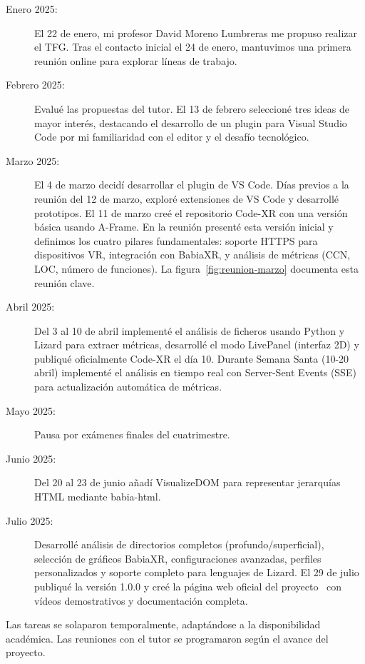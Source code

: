 \documentclass[a4paper, 12pt]{book}
\begin{document}
\begin{description}
    \item[Enero 2025:] El 22 de enero, mi profesor David Moreno Lumbreras me propuso realizar el TFG. Tras el contacto inicial el 24 de enero, mantuvimos una primera reunión online para explorar líneas de trabajo.

    \item[Febrero 2025:] Evalué las propuestas del tutor. El 13 de febrero seleccioné tres ideas de mayor interés, destacando el desarrollo de un plugin para Visual Studio Code por mi familiaridad con el editor y el desafío tecnológico.

    \item[Marzo 2025:] El 4 de marzo decidí desarrollar el plugin de VS Code. Días previos a la reunión del 12 de marzo, exploré extensiones de VS Code y desarrollé prototipos. El 11 de marzo creé el repositorio Code-XR con una versión básica usando A-Frame. En la reunión presenté esta versión inicial y definimos los cuatro pilares fundamentales: soporte HTTPS para dispositivos VR, integración con BabiaXR, y análisis de métricas (CCN, LOC, número de funciones). La figura~\ref{fig:reunion-marzo} documenta esta reunión clave.

    \item[Abril 2025:] Del 3 al 10 de abril implementé el análisis de ficheros usando Python y Lizard para extraer métricas, desarrollé el modo LivePanel (interfaz 2D) y publiqué oficialmente Code-XR el día 10. Durante Semana Santa (10-20 abril) implementé el análisis en tiempo real con Server-Sent Events (SSE) para actualización automática de métricas.

    \item[Mayo 2025:] Pausa por exámenes finales del cuatrimestre.

    \item[Junio 2025:] Del 20 al 23 de junio añadí VisualizeDOM para representar jerarquías HTML mediante babia-html.

    \item[Julio 2025:] Desarrollé análisis de directorios completos (profundo/superficial), selección de gráficos BabiaXR, configuraciones avanzadas, perfiles personalizados y soporte completo para lenguajes de Lizard. El 29 de julio publiqué la versión 1.0.0 y creé la página web oficial del proyecto~\cite{montes2025web} con vídeos demostrativos y documentación completa.
\end{description}

Las tareas se solaparon temporalmente, adaptándose a la disponibilidad académica. Las reuniones con el tutor se programaron según el avance del proyecto.
\end{document}
